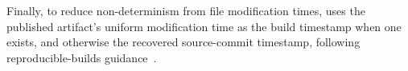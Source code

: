 Finally, to reduce non-determinism from file modification times, \toolname uses the published artifact's uniform modification time as the build timestamp when one exists, and otherwise the recovered source-commit timestamp, following reproducible-builds guidance~\cite{reproducible-builds-sde}.






